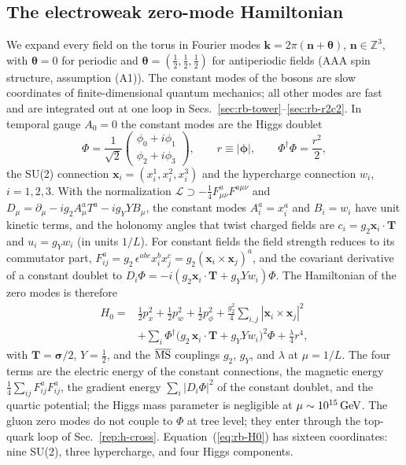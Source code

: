 \subsection{The electroweak zero-mode Hamiltonian}
\label{sec:rb-H0}

We expand every field on the torus in Fourier modes $\bm k=2\pi(\bm n+\bm\theta)$, $\bm n\in\mathbb Z^3$, with $\bm\theta=0$ for periodic and $\bm\theta=(\frac12,\frac12,\frac12)$ for antiperiodic fields (AAA spin structure, assumption (A1)).
The constant modes of the bosons are slow coordinates of finite-dimensional quantum mechanics; all other modes are fast and are integrated out at one loop in Secs.~\ref{sec:rb-tower}--\ref{sec:rb-r2c2}.
In temporal gauge $A_0=0$ the constant modes are the Higgs doublet
\begin{equation}
\Phi=\frac{1}{\sqrt2}\begin{pmatrix}\phi_0+i\phi_1\\ \phi_2+i\phi_3\end{pmatrix},\qquad r\equiv|\bm\phi|,\qquad \Phi^\dagger\Phi=\frac{r^2}{2},
\label{eq:rb-Phi}
\end{equation}
the SU(2) connection $\bm x_i=(x_i^1,x_i^2,x_i^3)$ and the hypercharge connection $w_i$, $i=1,2,3$.
With the normalization $\mathcal L\supset-\frac14F^a_{\mu\nu}F^{a\mu\nu}$ and $D_\mu=\partial_\mu-ig_2A_\mu^aT^a-ig_YYB_\mu$, the constant modes $A_i^a=x_i^a$ and $B_i=w_i$ have unit kinetic terms, and the holonomy angles that twist charged fields are $c_i=g_2\bm x_i\cdot\bm T$ and $u_i=g_Yw_i$ (in units $1/L$).
For constant fields the field strength reduces to its commutator part, $F_{ij}^a=g_2\,\epsilon^{abc}x_i^bx_j^c=g_2(\bm x_i\times\bm x_j)^a$, and the covariant derivative of a constant doublet to $D_i\Phi=-i(g_2\bm x_i\cdot\bm T+g_YYw_i)\Phi$.
The Hamiltonian of the zero modes is therefore~\cite{Luscher:1982ma,Koller:1987fq,vanBaal:2000zc}
\begin{align}
H_0={}&\tfrac12 p_x^2+\tfrac12 p_w^2+\tfrac12 p_\phi^2+\frac{g_2^2}{4}\sum_{i,j}|\bm{x}_i\times\bm{x}_j|^2 \nonumber\\
&+\sum_i\Phi^\dagger\bigl(g_2\,\bm{x}_i\cdot\bm{T}+g_Y Y w_i\bigr)^2\Phi+\frac{\lambda}{4}r^4,
\label{eq:rb-H0}
\end{align}
with $\bm T=\bm\sigma/2$, $Y=\frac12$, and the $\overline{\mathrm{MS}}$ couplings $g_2$, $g_Y$, and $\lambda$ at $\mu=1/L$.
The four terms are the electric energy of the constant connections, the magnetic energy $\frac14\sum_{ij}F_{ij}^aF_{ij}^a$, the gradient energy $\sum_i|D_i\Phi|^2$ of the constant doublet, and the quartic potential; the Higgs mass parameter is negligible at $\mu\sim10^{15}\,\mathrm{GeV}$.
The gluon zero modes do not couple to $\Phi$ at tree level; they enter through the top-quark loop of Sec.~\ref{rep:h-cross}.
Equation~(\ref{eq:rb-H0}) has sixteen coordinates: nine SU(2), three hypercharge, and four Higgs components.

